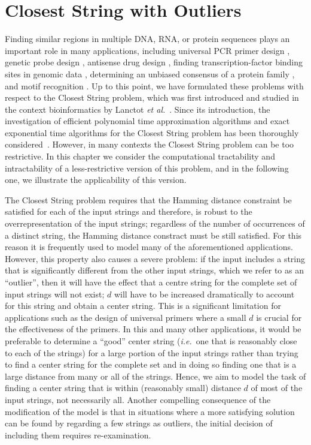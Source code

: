 \chapter{{\sc Closest String with Outliers}}\label{chapter:cswo}

Finding similar regions in multiple DNA, RNA, or protein sequences plays an important role in many applications, including universal PCR primer design \cite{DRSS,LLMWZ00,LBOT,PH}, genetic probe design \cite{LLMWZ00}, antisense drug design \cite{DLLM,LLMWZ00}, finding transcription-factor binding sites in genomic data \cite{tompa}, determining an unbiased consensus of a protein family \cite{BLPR}, and motif recognition \cite{LLMWZ00,Pav01,PS00}.  Up to this point, we have formulated these problems with respect to the {\sc Closest String} problem, which was first introduced and studied in the context bioinformatics by Lanctot {\em et al.}\ \cite{LLMWZ00}.  Since its introduction, the investigation of efficient polynomial time approximation algorithms and exact exponential time algorithms for the {\sc Closest String} problem has been thoroughly considered~\cite{FGN06,FGN,GNR03,LLMWZ00,LMW02,ma00,MS08}. However, in many contexts the {\sc Closest String} problem can be too restrictive.  In this chapter we consider the computational tractability and intractability of a less-restrictive version of this problem, and in the following one, we illustrate the applicability of this version.  

The {\sc Closest String} problem requires that the Hamming distance constraint be satisfied for each of the input strings and therefore, is robust to the overrepresentation of the input strings; regardless of the number of occurrences of a distinct string, the Hamming distance constract must be still satisfied.  For this reason it is frequently used to model many of the aforementioned applications.  However, this property also causes a severe problem: if the input includes a string that is significantly different from the other input strings, which we refer to as an ``outlier'', then it will have the effect that a centre string for the complete set of input strings will not exist; $d$ will have to be increased dramatically to account for this string and obtain a center string. This is a significant limitation for applications such as the design of universal primers where a small $d$ is crucial for the effectiveness of the primers.  In this and many other applications, it would be preferable to determine a ``good'' center string ({\em i.e.}\ one that is reasonably close to each of the strings) for a large portion of the input strings rather than trying to find a center string for the complete set and in doing so finding one that is a large distance from many or all of the strings.   Hence, we aim to model the task of finding a center string that is within (reasonably small) distance $d$ of most of the input strings, not necessarily all.  Another compelling consequence of the modification of the model is that in situations where a more satisfying solution can be found by regarding a few strings as outliers, the initial decision of including them requires re-examination.

